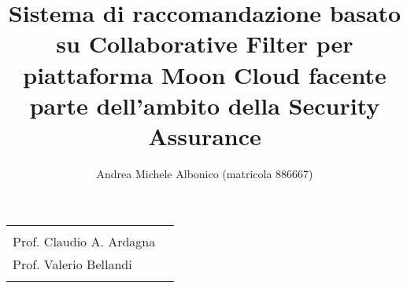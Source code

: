 \documentclass[10pt,a4paper]{article}
\begin{document}
    \title{\textbf{Sistema di raccomandazione basato su Collaborative Filter per piattaforma Moon Cloud
    facente parte dell'ambito della Security Assurance}}
    \author{Andrea Michele Albonico (matricola 886667)}
    \date{}

    \maketitle

    \vspace{0.5cm}

    \begin{minipage}{\linewidth}
        \begin{tabular}{l r}
            \begin{minipage}[t]{.4\linewidth}
                \begin{flushleft}
                    {
                        RELATORE\\[.15cm]
                        Prof. Claudio A. Ardagna
                    }
                \end{flushleft}
            \end{minipage}
            &
            \begin{minipage}[t]{.53\linewidth}
                \begin{flushright}
                    {
                        CORRELATORE\\[.15cm]
                        Prof. Valerio Bellandi\\[.1cm]
                    }
                \end{flushright}
            \end{minipage}
        \end{tabular}
    \end{minipage}

    \vspace{2cm}

\end{document}
